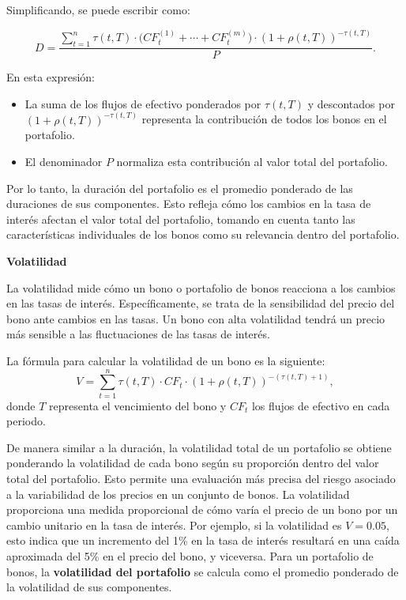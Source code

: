 \documentclass[12pt]{article}
\begin{document}
Simplificando, se puede escribir como:

\[
D = \frac{\sum_{t=1}^n \tau(t, T) \cdot \big(CF_t^{(1)} + \cdots + CF_t^{(m)}\big) \cdot (1 + \rho(t, T))^{-\tau(t, T)}}{P}.
\]

En esta expresión:
\begin{itemize}
    \item La suma de los flujos de efectivo ponderados por \( \tau(t, T) \) y descontados por \( (1 + \rho(t, T))^{-\tau(t, T)} \) representa la contribución de todos los bonos en el portafolio.
    \item El denominador \( P \) normaliza esta contribución al valor total del portafolio.
\end{itemize}

Por lo tanto, la duración del portafolio es el promedio ponderado de las duraciones de sus componentes. Esto refleja cómo los cambios en la tasa de interés afectan el valor total del portafolio, tomando en cuenta tanto las características individuales de los bonos como su relevancia dentro del portafolio.

\noindent \textbf{Volatilidad}

La volatilidad mide cómo un bono o portafolio de bonos reacciona a los cambios en las tasas de interés. Específicamente, se trata de la sensibilidad del precio del bono ante cambios en las tasas. Un bono con alta volatilidad tendrá un precio más sensible a las fluctuaciones de las tasas de interés.

La fórmula para calcular la volatilidad de un bono es la siguiente:
\[
V = \sum_{t=1}^n \tau(t, T) \cdot CF_t \cdot (1 + \rho(t, T))^{-(\tau(t, T)+1)},
\]
donde \(T\) representa el vencimiento del bono y \(CF_t\) los flujos de efectivo en cada periodo.


De manera similar a la duración, la volatilidad total de un portafolio se obtiene ponderando la volatilidad de cada bono según su proporción dentro del valor total del portafolio. Esto permite una evaluación más precisa del riesgo asociado a la variabilidad de los precios en un conjunto de bonos. La volatilidad proporciona una medida proporcional de cómo varía el precio de un bono por un cambio unitario en la tasa de interés. Por ejemplo, si la volatilidad es \( V = 0.05 \), esto indica que un incremento del 1\% en la tasa de interés resultará en una caída aproximada del 5\% en el precio del bono, y viceversa. Para un portafolio de bonos, la \textbf{volatilidad del portafolio} se calcula como el promedio ponderado de la volatilidad de sus componentes.
\end{document}
